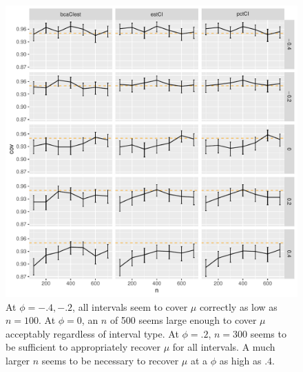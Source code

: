 \documentclass[12pt, letterpaper, titlepage]{article}
\begin{document}
\begin{figure}[tbp]
  \centering
  \includegraphics[width=\textwidth]{figures/plot_mu}
  \caption{At $\phi = -.4, -.2$, all intervals seem to cover $\mu$ correctly
    as low as $n = 100$. At $\phi = 0$, an $n$ of 500 seems large enough to
    cover $\mu$ acceptably regardless of interval type. At $\phi = .2$,
    $n = 300$ seems to be sufficient to appropriately recover $\mu$ for all
    intervals. A much larger $n$ seems to be necessary to recover $\mu$ at a
    $\phi$ as high as $.4$.}
  \label{fig:plot_mu}
\end{figure}
\end{document}
